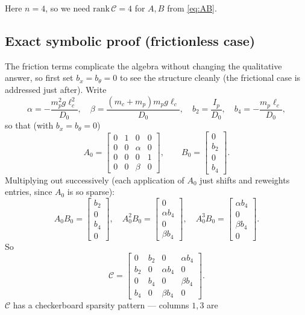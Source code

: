 \documentclass[11pt]{article}
\begin{document}
Here $n=4$, so we need $\mathrm{rank}\,\mathcal C = 4$ for $A,B$ from
\eqref{eq:AB}.

\subsection{Exact symbolic proof (frictionless case)}
The friction terms complicate the algebra without changing the qualitative
answer, so first set $b_x=b_\theta=0$ to see the structure cleanly (the
frictional case is addressed just after). Write
\[
  \alpha = -\frac{m_p^2 g\ell_c^2}{D_0}, \quad
  \beta = \frac{(m_c+m_p)m_p g\ell_c}{D_0}, \quad
  b_2 = \frac{I_p}{D_0}, \quad b_4 = -\frac{m_p\ell_c}{D_0},
\]
so that (with $b_x=b_\theta=0$)
\[
  A_0 = \begin{bmatrix} 0&1&0&0\\0&0&\alpha&0\\0&0&0&1\\0&0&\beta&0
  \end{bmatrix}, \qquad B_0 = \begin{bmatrix}0\\b_2\\0\\b_4\end{bmatrix}.
\]
Multiplying out successively (each application of $A_0$ just shifts and
reweights entries, since $A_0$ is so sparse):
\[
  A_0B_0 = \begin{bmatrix}b_2\\0\\b_4\\0\end{bmatrix},\quad
  A_0^2B_0 = \begin{bmatrix}0\\\alpha b_4\\0\\\beta b_4\end{bmatrix},\quad
  A_0^3B_0 = \begin{bmatrix}\alpha b_4\\0\\\beta b_4\\0\end{bmatrix}.
\]
So
\[
  \mathcal C = \begin{bmatrix}
  0 & b_2 & 0 & \alpha b_4\\
  b_2 & 0 & \alpha b_4 & 0\\
  0 & b_4 & 0 & \beta b_4\\
  b_4 & 0 & \beta b_4 & 0
  \end{bmatrix}.
\]
$\mathcal C$ has a checkerboard sparsity pattern — columns $1,3$ are
\end{document}
